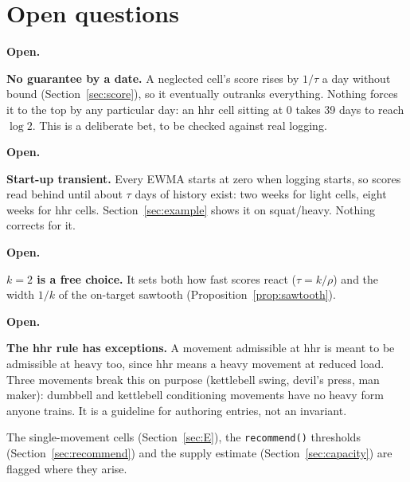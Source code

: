\documentclass[11pt]{article}
\newenvironment{openitem}{%
  \def\FrameCommand{\fboxsep=8pt{\color{openbar}\vrule width 3pt}\colorbox{openbg}}%
  \MakeFramed{\advance\hsize-\width \FrameRestore}\noindent
  \textbf{Open.}\ %
}{%
  \endMakeFramed\medskip
}
\theoremstyle{plain}
\theoremstyle{definition}
\newcommand{\code}[1]{\texttt{#1}}
\newcommand{\heavy}{\mathrm{heavy}}
\newcommand{\hhr}{\mathrm{hhr}}
\begin{document}
\section{Open questions}\label{sec:open}

\begin{openitem}
\textbf{No guarantee by a date.} A neglected cell's score rises by
$1/\tau$ a day without bound (Section~\ref{sec:score}), so it eventually
outranks everything. Nothing forces it to the top by any particular
day: an $\hhr$ cell sitting at $0$ takes 39 days to reach $\log 2$. This
is a deliberate bet, to be checked against real logging.
\end{openitem}

\begin{openitem}
\textbf{Start-up transient.} Every EWMA starts at zero when logging
starts, so scores read behind until about $\tau$ days of history exist:
two weeks for light cells, eight weeks for hhr cells.
Section~\ref{sec:example} shows it on squat/heavy. Nothing corrects for
it.
\end{openitem}

\begin{openitem}
\textbf{$k = 2$ is a free choice.} It sets both how fast scores react
($\tau = k/\rho$) and the width $1/k$ of the on-target sawtooth
(Proposition~\ref{prop:sawtooth}).
\end{openitem}

\begin{openitem}
\textbf{The hhr rule has exceptions.} A movement admissible at $\hhr$ is
meant to be admissible at $\heavy$ too, since $\hhr$ means a heavy
movement at reduced load. Three movements break this on purpose
(kettlebell swing, devil's press, man maker): dumbbell and kettlebell
conditioning movements have no heavy form anyone trains. It is a
guideline for authoring entries, not an invariant.
\end{openitem}

The single-movement cells (Section~\ref{sec:E}), the \code{recommend()}
thresholds (Section~\ref{sec:recommend}) and the supply estimate
(Section~\ref{sec:capacity}) are flagged where they arise.
\end{document}
